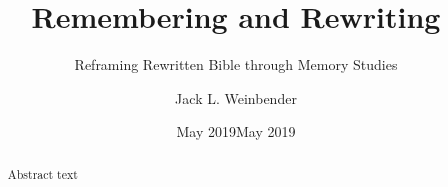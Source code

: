 \documentclass[letterpaper,12pt,oneside]{utexas-dissertation}
\begin{document}
\author{Jack L. Weinbender}
\date{May 2019}
\title{Remembering and Rewriting}
\subtitle{Reframing Rewritten Bible through Memory Studies}
\date{May 2019}

\frontmatter
\maketitle


\makecopyright


\makesignatures

\begin{abstract}
Abstract text
\end{abstract}

\tableofcontents*
\mainmatter



\nocite{*}
\backmatter

\printbibliography[heading=bibintoc]
\end{document}
